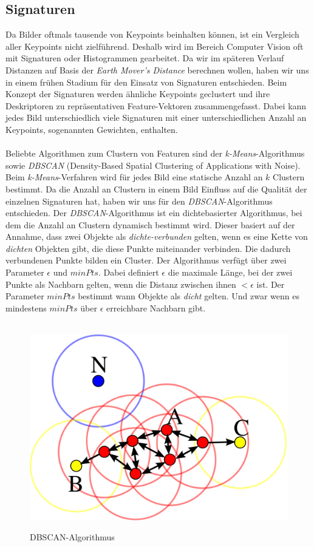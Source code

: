 \documentclass{scrartcl}
\begin{document}
\subsection{Signaturen}
Da Bilder oftmals tausende von Keypoints beinhalten können, ist ein Vergleich aller Keypoints nicht zielführend. Deshalb wird im Bereich Computer Vision oft mit Signaturen oder Histogrammen gearbeitet. Da wir im späteren Verlauf Distanzen auf Basis der \textit{Earth Mover's Distance} berechnen wollen, haben wir uns in einem frühen Stadium für den Einsatz von Signaturen entschieden. Beim Konzept der Signaturen werden ähnliche Keypoints geclustert und ihre Deskriptoren zu repräsentativen Feature-Vektoren zusammengefasst. Dabei kann jedes Bild unterschiedlich viele Signaturen mit einer unterschiedlichen Anzahl an Keypoints, sogenannten Gewichten, enthalten.
\\
\\
Beliebte Algorithmen zum Clustern von Featuren sind der  \textit{k-Means}-Algorithmus sowie \textit{DBSCAN} (Density-Based Spatial Clustering of Applications with Noise). Beim \textit{k-Means}-Verfahren wird für jedes Bild eine statische Anzahl an $k$ Clustern bestimmt. Da die Anzahl an Clustern in einem Bild Einfluss auf die Qualität der einzelnen Signaturen hat, haben wir uns für den  \textit{DBSCAN}-Algorithmus entschieden. Der  \textit{DBSCAN}-Algorithmus ist ein dichtebasierter Algorithmus, bei dem die Anzahl an Clustern dynamisch bestimmt wird. Dieser basiert auf der Annahme, dass zwei Objekte als \textit{dichte-verbunden} gelten, wenn es eine Kette von \textit{dichten} Objekten gibt, die diese Punkte miteinander verbinden. Die dadurch verbundenen Punkte bilden ein Cluster. Der Algorithmus verfügt über zwei Parameter $\epsilon$ und $minPts$. Dabei definiert $\epsilon$ die maximale Länge, bei der zwei Punkte als Nachbarn gelten, wenn die Distanz zwischen ihnen  $< \epsilon$ ist. Der Parameter $minPts$  bestimmt wann Objekte als \textit{dicht} gelten. Und zwar wenn es mindestens $minPts$ über $\epsilon$ erreichbare Nachbarn gibt.
\\
\\
\begin{figure}[h]
\begin{center}
\includegraphics[scale=0.15]{dbscan.png}
\label{fig:DBSCAN}
\caption{DBSCAN-Algorithmus}
\end{center}
\end{figure}
\end{document}
